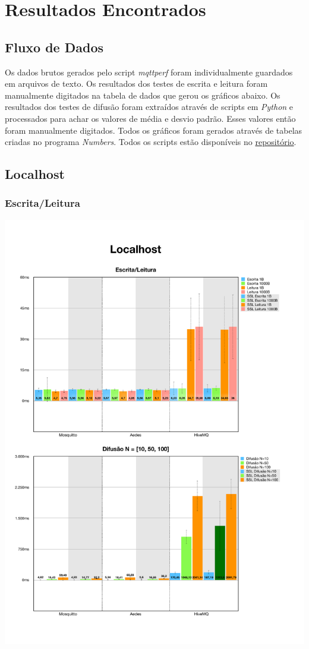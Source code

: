 \documentclass[12pt,a4paper]{article}
\begin{document}
\section{Resultados Encontrados}

\subsection{Fluxo de Dados}
Os dados brutos gerados pelo script \textit{mqttperf} foram individualmente guardados em arquivos de texto. Os resultados dos testes de escrita e leitura foram manualmente digitados na tabela de dados que gerou os gráficos abaixo. Os resultados dos testes de difusão foram extraídos através de scripts em \textit{Python} e processados para achar os valores de média e desvio padrão. Esses valores então foram manualmente digitados. Todos os gráficos foram gerados através de tabelas criadas no programa \textit{Numbers}. Todos os scripts estão disponíveis no \href{https://github.com/batmacumba/mqtt}{repositório}.

\subsection{Localhost}
\subsubsection{Escrita/Leitura}
\begin{center}
\includegraphics[width=1.0\textwidth]{local_wr.pdf}
\end{center}
\end{document}

